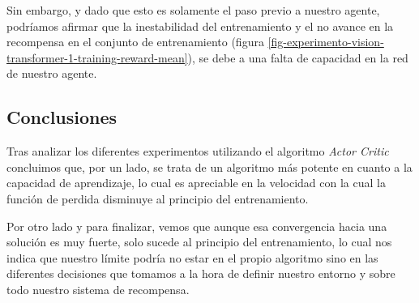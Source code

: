Sin embargo, y dado que esto es solamente el paso previo a nuestro agente, podríamos afirmar que la inestabilidad del entrenamiento y el no avance en la recompensa en el conjunto de entrenamiento (figura \ref{fig-experimento-vision-transformer-1-training-reward-mean}), se debe a una falta de capacidad en la red de nuestro agente.
\medskip

\subsection{Conclusiones}
\label{resultados-conclusiones-actor-critic-experimentos}

Tras analizar los diferentes experimentos utilizando el algoritmo \textit{Actor Critic} concluimos que, por un lado, se trata de un algoritmo más potente en cuanto a la capacidad de aprendizaje, lo cual es apreciable en la velocidad con la cual la función de perdida disminuye al principio del entrenamiento.
\medskip

Por otro lado y para finalizar, vemos que aunque esa convergencia hacia una solución es muy fuerte, solo sucede al principio del entrenamiento, lo cual nos indica que nuestro límite podría no estar en el propio algoritmo sino en las diferentes decisiones que tomamos a la hora de definir nuestro entorno y sobre todo nuestro sistema de recompensa.
\medskip